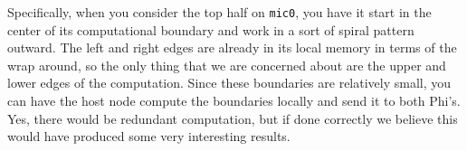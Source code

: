 Specifically, when you consider the top half on \texttt{mic0}, you have it start in the center of its computational boundary
and work in a sort of spiral pattern outward.  The left and right edges are already in its local memory in terms of the wrap
around, so the only thing that we are concerned about are the upper and lower edges of the computation.  Since these boundaries
are relatively small, you can have the host node compute the boundaries locally and send it to both Phi's.  Yes, there would
be redundant computation, but if done correctly we believe this would have produced some very interesting results.
